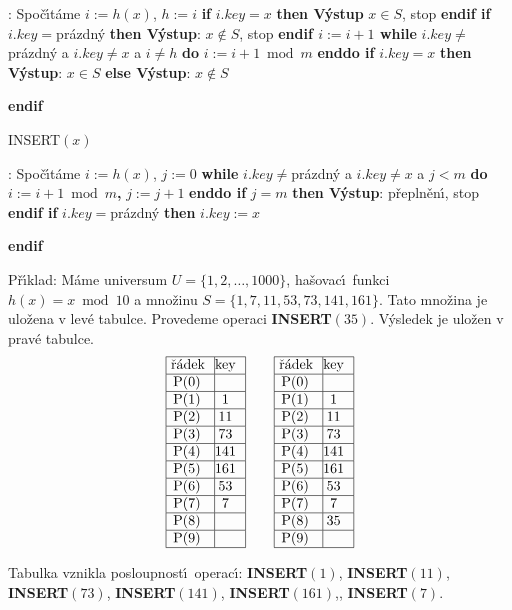 :\newline 
Spo\v c\'\i t\'ame $i:=h(x)$, $h:=i$\newline 
{\bf if} $i.key=x$ {\bf then V\'ystup} $x\in S$, stop {\bf endif\newline 
if} $i.key=$pr\'azdn\'y {\bf then {{\rm V\'ystup}}}: $x\notin S$, stop {\bf endif\newline 
$i:=i+1$\newline 
while} $i.key\ne$pr\'azdn\'y a $i.key\ne x$ a $i\ne h$ {\bf do} $
i:=i+1\bmod m$ {\bf enddo\newline 
if} $i.key=x$ {\bf then V\'ystup}: $x\in S$ {\bf else V\'ystup}: $
x\notin S$ {\bf endif
\medskip

\flushpar INSERT$(x)$}:\newline 
Spo\v c\'\i t\'ame $i:=h(x)$, $j:=0$\newline 
{\bf while} $i.key\ne$pr\'azdn\'y a $i.key\ne x$ a $j<m$ {\bf do} $
i:=i+1\bmod m${\bf ,} $j:=j+1$ {\bf enddo\newline 
if} $j=m$ {\bf then V\'ystup}: p\v repln\v en\'\i , stop {\bf endif\newline 
if} $i.key=$pr\'azdn\'y {\bf then} $i.key:=x$ {\bf endif
\bigskip

}\flushpar P\v r\'\i klad: M\'ame universum $U=\{1,2,\dots,1000\}$, 
ha\v sovac\'\i\ funk\-ci $h(x)=x\bmod10$ a mno\v zinu  
$S=\{1,7,11,53,73,141,161\}$. Tato mno\v zina je ulo\v zena v lev\'e tabulce. 
Provedeme operaci {\bf INSERT$(35)$}. V\'ysledek je ulo\v zen v 
prav\'e tabulce.
$$\vbox {\hbox{\vtop{\offinterlineskip\halign{\strut\vrule\ # & \vrule\hfil# \hfil\vrule\cr\noalign{\hrule}\v r\'adek & key \hfil\cr\noalign{\hrule}P(0) & \hfill \cr\noalign{\hrule}P(1) & 1 \cr\noalign{\hrule}P(2) & 11 \cr\noalign{\hrule}P(3) & 73 \cr\noalign{\hrule}P(4) & 141 \cr\noalign{\hrule}P(5) & 161 \cr\noalign{\hrule}P(6) & 53 \cr\noalign{\hrule}P(7) & 7 \cr\noalign{\hrule}P(8) & \hfill\cr\noalign{\hrule}P(9) & \hfill \cr\noalign{\hrule}}}\qquad\vtop{\offinterlineskip\halign {\strut\vrule\ # & \vrule \hfil # \hfil \vrule\cr\noalign{\hrule}\v r\'adek & key \hfil \cr\noalign{\hrule}P(0) & \hfill \cr\noalign{\hrule}P(1) & 1 \cr\noalign{\hrule}P(2) & 11 \cr\noalign{\hrule}P(3) & 73 \cr\noalign{\hrule}P(4) & 141 \cr\noalign{\hrule}P(5) & 161 \cr\noalign{\hrule}P(6) & 53 \cr\noalign{\hrule}P(7) & 7 \cr\noalign{\hrule}P(8) & 35  \cr\noalign{\hrule}P(9) & \hfill \cr\noalign{\hrule}}}}}$$

\flushpar Tabulka vznikla posloupnost\'\i\ operac\'\i :\newline 
{\bf INSERT$(1)$}, {\bf INSERT$(11)$}, {\bf INSERT$(73)$}, 
{\bf INSERT$(141)$}, {\bf INSERT$(161)$},, {\bf INSERT$
(7)$}. 

